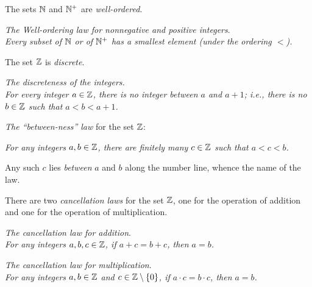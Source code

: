 \medskip


The sets $\mathbb{N}$ and $\mathbb{N}^+$ are {\it well-ordered}.
\medskip

\noindent
{\it The Well-ordering law for nonnegative and positive integers}. \\
%
{\it Every subset of $\mathbb{N}$ or of $\mathbb{N}^+$ has a smallest element (under
  the ordering $<$).}

\medskip


The set $\mathbb{Z}$ is {\it discrete}.
\medskip

\noindent
{\it The discreteness of the integers.} \\
%
{\it For every integer $a \in \mathbb{Z}$, there is no integer between $a$ and
  $a+1$; i.e., there is no $b \in \mathbb{Z}$ such that $a < b < a+1$.}

\medskip


{\it The ``between-ness'' law} for the set $\mathbb{Z}$:
\smallskip

\noindent
{\it For any integers $a, b \in \mathbb{Z}$, there are finitely many $c \in
  \mathbb{Z}$ such that $a < c < b$.}
\smallskip

\noindent
Any such $c$ lies {\em between} $a$ and $b$ along the number
line, whence the name of the law.

\medskip


There are two {\it cancellation laws} for the set $\mathbb{Z}$,
 one for the operation of addition
and one for the operation of multiplication.
\medskip

\noindent
{\it The cancellation law for addition}. \\
%
{\it For any integers $a, b, c \in \mathbb{Z}$, if $a+c = b+c$, then $a = b$.}
\smallskip

\noindent
{\it The cancellation law for multiplication}. \\
%
{\it For any integers $a, b \in \mathbb{Z}$ and $c \in \mathbb{Z} \setminus \{0\}$, if
  $a \cdot c = b \cdot c$, then $a = b$.}
\smallskip

